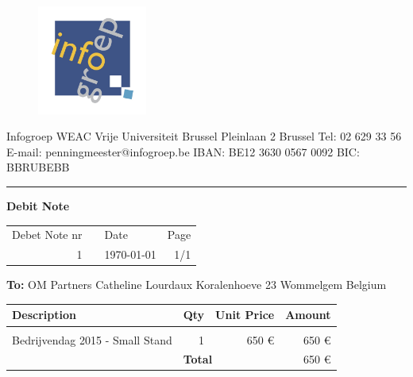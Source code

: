 \documentclass{letter}
\begin{document}
\begin{figure}
  \begin{center}
    \includegraphics[width=0.32\textwidth]{invoices/ig.jpg}
  \end{center}
\end{figure}

Infogroep
\newline
WEAC
\newline
Vrije Universiteit Brussel
\newline
Pleinlaan 2 
 Brussel
\newline
\newline
Tel: 02 629 33 56
\newline
E-mail: penningmeester@infogroep.be
\newline
\newline
IBAN: BE12 3630 0567 0092
\newline
BIC: BBRUBEBB

\rule{\textwidth}{1pt}
\newline


\textbf{\huge{
Debit Note
}}

\begin{tabular}{ r p{10cm} l r}
	Debet Note nr & & Date & Page \\
	1 & & \today & 1/1 \\
\end{tabular} 
\vspace{1cm}


\textbf{To:}
\newline
OM Partners
\newline
Catheline Lourdaux
\newline
Koralenhoeve 23
 Wommelgem
\newline
Belgium




\begin{tabular}{ |p{12cm} | r | r | r |}
	\hline
	\rowcolor{lightgray}
	Description & Qty & Unit Price & Amount \\ [2pt]
	\hline
	&&&\\
	Bedrijvendag 2015 - Small Stand & 1 & 650 \euro & 650  \euro \\[8cm]
	
	\hline
	
	 \multicolumn{1}{c}{}& \multicolumn{2}{|l|}{\cellcolor{lightgray} \textbf{Total}} & 650 \euro\\[2pt]
	\cline{2-4}
	
\end{tabular} 
\end{document}
